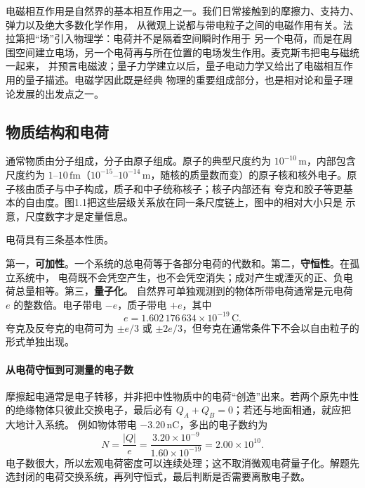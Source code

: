 电磁相互作用是自然界的基本相互作用之一。我们日常接触到的摩擦力、支持力、弹力以及绝大多数化学作用，
从微观上说都与带电粒子之间的电磁作用有关。法拉第把“场”引入物理学：电荷并不是隔着空间瞬时作用于
另一个电荷，而是在周围空间建立电场，另一个电荷再与所在位置的电场发生作用。麦克斯韦把电与磁统一起来，
并预言电磁波；量子力学建立以后，量子电动力学又给出了电磁相互作用的量子描述。电磁学因此既是经典
物理的重要组成部分，也是相对论和量子理论发展的出发点之一。

\subsection*{物质结构和电荷}

通常物质由分子组成，分子由原子组成。原子的典型尺度约为 $10^{-10}\,\mathrm m$，内部包含尺度约为
$1$--$10\,\mathrm{fm}$（$10^{-15}$--$10^{-14}\,\mathrm m$，随核的质量数而变）的原子核和核外电子。原子核由质子与中子构成，质子和中子统称核子；核子内部还有
夸克和胶子等更基本的自由度。图1.1把这些层级关系放在同一条尺度链上，图中的相对大小只是
示意，尺度数字才是定量信息。

\matterScaleFigure
{}

电荷具有三条基本性质。

第一，\textbf{可加性}。一个系统的总电荷等于各部分电荷的代数和。第二，\textbf{守恒性}。在孤立系统中，
电荷既不会凭空产生，也不会凭空消失；成对产生或湮灭的正、负电荷总量相等。第三，\textbf{量子化}。
自然界可单独观测到的物体所带电荷通常是元电荷 $e$ 的整数倍。电子带电 $-e$，质子带电 $+e$，其中
\begin{equation}
  \boxed{e=1.602\,176\,634\times10^{-19}\,\mathrm C}.
\end{equation}
夸克及反夸克的电荷可为 $\pm e/3$ 或 $\pm2e/3$，但夸克在通常条件下不会以自由粒子的形式单独出现。


\paragraph{从电荷守恒到可测量的电子数}
摩擦起电通常是电子转移，并非把中性物质中的电荷“创造”出来。若两个原先中性的绝缘物体只彼此交换电子，最后必有 $Q_A+Q_B=0$；若还与地面相通，就应把大地计入系统。
例如物体带电 $-3.20\,\mathrm{nC}$，多出的电子数约为
\[
 N=\frac{|Q|}{e}=\frac{3.20\times10^{-9}}{1.60\times10^{-19}}=2.00\times10^{10}.
\]
电子数很大，所以宏观电荷密度可以连续处理；这不取消微观电荷量子化。解题先选封闭的电荷交换系统，再列守恒式，最后判断是否需要离散电子数。

